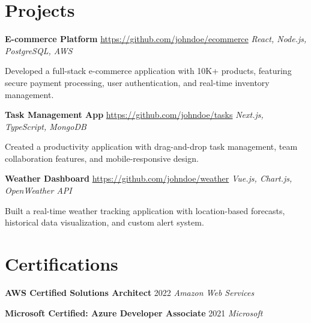 \documentclass[10pt]{article}
\begin{document}
\section*{Projects}

\textbf{E-commerce Platform} \hfill \url{https://github.com/johndoe/ecommerce}
\hfill \textit{React, Node.js, PostgreSQL, AWS}

Developed a full-stack e-commerce application with 10K+ products, featuring secure payment processing, user authentication, and real-time inventory management.

\textbf{Task Management App} \hfill \url{https://github.com/johndoe/tasks}
\hfill \textit{Next.js, TypeScript, MongoDB}

Created a productivity application with drag-and-drop task management, team collaboration features, and mobile-responsive design.

\textbf{Weather Dashboard} \hfill \url{https://github.com/johndoe/weather}
\hfill \textit{Vue.js, Chart.js, OpenWeather API}

Built a real-time weather tracking application with location-based forecasts, historical data visualization, and custom alert system.

\section*{Certifications}

\textbf{AWS Certified Solutions Architect} \hfill 2022
\textit{Amazon Web Services}

\textbf{Microsoft Certified: Azure Developer Associate} \hfill 2021
\textit{Microsoft}
\end{document}
